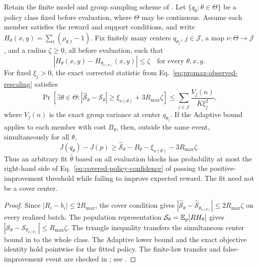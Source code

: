 \begin{corollary}
\label{cor:covered-policy-certificate}
Retain the finite model and group sampling scheme of
. Let $\{q_\theta:\theta\in\Theta\}$
be a policy class fixed before evaluation, where $\Theta$ may be continuous.
Assume each member satisfies the reward and support conditions, and write
$H_\theta(x,y)=\sum_t(\rho_{\theta,t}-1)$.
Fix finitely many centers $q_{\theta_j}$, $j\in\mathcal J$, a map
$\nu:\Theta\to\mathcal J$, and a radius $\zeta\ge0$, all before evaluation,
such that
\begin{equation}
    |H_\theta(x,y)-H_{\theta_{\nu(\theta)}}(x,y)|\le\zeta
    \quad\text{for every }\theta,x,y.
    \label{eq:policy-cover-condition}
\end{equation}
For fixed $\xi_j>0$, the exact corrected statistic from
Eq.~\eqref{eq:promax-observed-rescaling} satisfies
\begin{equation}
    \Pr\!\left[\exists\theta\in\Theta:
      |\widehat{\mathcal S}_\theta-\mathcal S_\theta|
        \ge\xi_{\nu(\theta)}+3R_{\max}\zeta\right]
    \le\sum_{j\in\mathcal J}\frac{V_j(n)}{K\xi_j^2},
    \label{eq:covered-policy-confidence}
\end{equation}
where $V_j(n)$ is the exact group variance at center $q_{\theta_j}$.
If the Adaptive bound applies to each member with cost $B_\theta$,
then, outside the same event, simultaneously for all $\theta$,
\begin{equation}
    J(q_\theta)-J(p)\ge
      \widehat{\mathcal S}_\theta-B_\theta
      -\xi_{\nu(\theta)}-3R_{\max}\zeta.
    \label{eq:covered-policy-reward}
\end{equation}
Thus an arbitrary fit $\hat\theta$ based on all evaluation blocks has
probability at most the right-hand side of
Eq.~\eqref{eq:covered-policy-confidence} of passing the positive-improvement
threshold while failing to improve expected reward. The fit need not be a
cover center.
\end{corollary}

\begin{proof}
Since $|R_i-b_i|\le2R_{\max}$, the cover condition gives
$|\widehat{\mathcal S}_\theta-\widehat{\mathcal S}_{\theta_{\nu(\theta)}}|
\le2R_{\max}\zeta$ on every realized batch. The population representation
$\mathcal S_\theta=\mathbb{E}_p[RH_\theta]$ gives
$|\mathcal S_\theta-\mathcal S_{\theta_{\nu(\theta)}}|\le R_{\max}\zeta$.
The triangle inequality transfers the simultaneous center bound in
 to the whole class. The Adaptive lower bound
and the exact objective identity hold pointwise for the fitted policy.
The finite-law transfer and false-improvement event are checked in
; see .
\end{proof}

